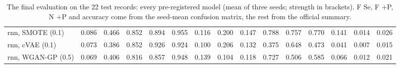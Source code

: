 \begin{table}[htbp]
{\begin{tabular}{lrrrrrrrrrrrrrr}
rnn, SMOTE (0.1) & 0.086 & 0.466 & 0.852 & 0.894 & 0.955 & 0.116 & 0.200 & 0.147 & 0.788 & 0.757 & 0.770 & 0.141 & 0.014 & 0.026 \\
rnn, cVAE (0.1) & 0.073 & 0.386 & 0.852 & 0.926 & 0.924 & 0.100 & 0.206 & 0.132 & 0.375 & 0.648 & 0.473 & 0.041 & 0.007 & 0.015 \\
rnn, WGAN-GP (0.5) & 0.069 & 0.406 & 0.816 & 0.857 & 0.948 & 0.139 & 0.104 & 0.118 & 0.727 & 0.506 & 0.585 & 0.066 & 0.012 & 0.021 \\
\bottomrule
\end{tabular}}
\caption{The final evaluation on the 22 test records: every pre-registered model (mean of three seeds; strength in brackets). F Se, F +P, N +P and accuracy come from the seed-mean confusion matrix, the rest from the official summary.}\label{tab:all-final}
\end{table}
